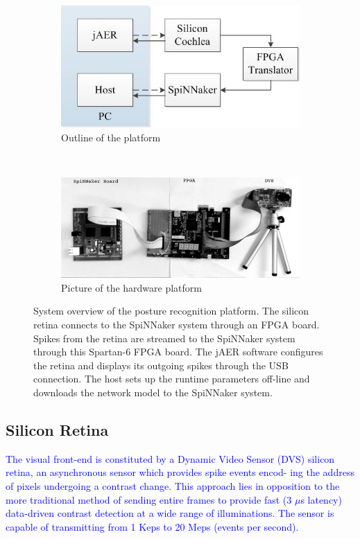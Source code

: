 \documentclass[journal]{journal}
\begin{document}
\begin{figure}
\centering
	\begin{subfigure}[t]{0.42\textwidth}
		\includegraphics[width=\textwidth]{pics/outline.jpg}
	    \caption{Outline of the platform}
	    \label{fig:SysOverViewa}
	\end{subfigure}
	\\
	\begin{subfigure}[t]{0.42\textwidth}
		\includegraphics[width=\textwidth]{pics/dvs_spinnaker.png}	    \caption{Picture of the hardware platform}
	    \label{fig:SysOverViewb}
	\end{subfigure}	

\caption{System overview of the posture recognition platform. The silicon retina connects to the SpiNNaker system through an FPGA board. 
Spikes from the retina are streamed to the SpiNNaker system through this Spartan-6 FPGA board.
The jAER software configures the retina and displays its outgoing spikes through the USB connection.
The host sets up the runtime parameters off-line and downloads the network model to the SpiNNaker system.
}
\label{fig:SysOverView}
\end{figure}

\subsection{Silicon Retina}
\textcolor{blue}{
The visual front-end is constituted by a Dynamic Video Sensor (DVS) silicon retina, an asynchronous sensor which provides spike events encod-
ing the address of pixels undergoing a contrast change\cite{wei2006robust}. 
This approach lies in opposition to the more traditional method of sending entire frames to provide fast (3 $\mu$s latency) data-driven contrast detection at a wide range of illuminations. 
The sensor is capable of transmitting from 1 Keps to 20 Meps (events per
second).}
\end{document}
